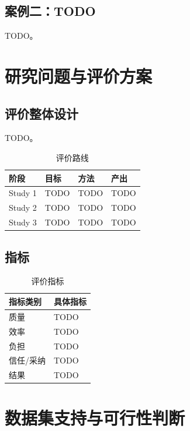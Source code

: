 \documentclass[UTF8,a4paper,11pt]{ctexart}
\begin{document}
\subsection{案例二：TODO}

TODO。

\section{研究问题与评价方案}

\subsection{评价整体设计}

TODO。

\begin{table}[H]
\centering
\caption{评价路线}
\begin{tabularx}{\textwidth}{p{2.8cm}p{3.5cm}p{3.8cm}X}
\toprule
\textbf{阶段} & \textbf{目标} & \textbf{方法} & \textbf{产出} \\
\midrule
Study 1 & TODO & TODO & TODO \\
\midrule
Study 2 & TODO & TODO & TODO \\
\midrule
Study 3 & TODO & TODO & TODO \\
\bottomrule
\end{tabularx}
\end{table}

\subsection{指标}

\begin{table}[H]
\centering
\caption{评价指标}
\begin{tabularx}{\textwidth}{p{4cm}X}
\toprule
\textbf{指标类别} & \textbf{具体指标} \\
\midrule
质量 & TODO \\
\midrule
效率 & TODO \\
\midrule
负担 & TODO \\
\midrule
信任/采纳 & TODO \\
\midrule
结果 & TODO \\
\bottomrule
\end{tabularx}
\end{table}

\section{数据集支持与可行性判断}
\end{document}
